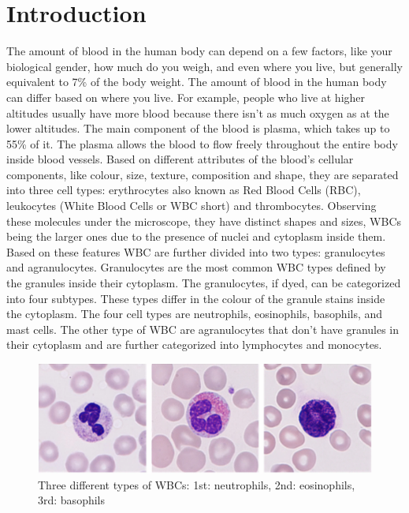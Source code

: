 \section{Introduction}
The amount of blood in the human body can depend on a few factors, like your biological gender, how much do you weigh, and even where you live, but generally equivalent to 7\% of the body weight. The amount of blood in the human body can differ based on where you live. For example, people who live at higher altitudes usually have more blood because there isn’t as much oxygen as at the lower altitudes. The main component of the blood is plasma, which takes up to 55\% of it.
The plasma allows the blood to flow freely throughout the entire body inside blood vessels. Based on different attributes of the blood’s cellular components, like colour, size, texture, composition and shape, they are separated into three cell types: erythrocytes also known as Red Blood Cells (RBC), leukocytes (White Blood Cells or WBC short) and thrombocytes. Observing these molecules under the microscope, they have distinct shapes and sizes, WBCs being the larger ones due to the presence of nuclei and cytoplasm inside them. 
Based on these features WBC are further divided into two types: granulocytes and agranulocytes. 
Granulocytes are the most common WBC types defined by the granules inside their cytoplasm. The granulocytes, if dyed, can be categorized into four subtypes. These types differ in the colour of the granule stains inside the cytoplasm. The four cell types are neutrophils, eosinophils, basophils, and mast cells. The other type of WBC are agranulocytes that don't have granules in their cytoplasm and are further categorized into lymphocytes and monocytes.

\begin{figure}[htbp]
    \begin{center}
    \includegraphics[scale=0.26]{wbc.png}
    \end{center}
    \caption{Three different types of WBCs: 1st: neutrophils, 2nd: eosinophils, 3rd: basophils}
    \label{wbc}
\end{figure}

